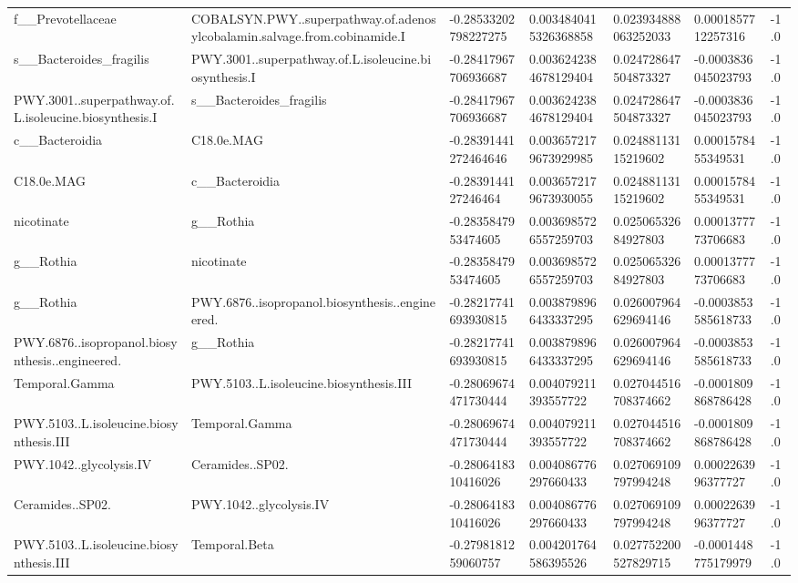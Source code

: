 \begin{longtable}{lllllll}
f\_\_Prevotellaceae & COBALSYN.PWY..superpathway.of.adenosylcobalamin.salvage.from.cobinamide.I & -0.28533202798227275 & 0.0034840415326368858 & 0.023934888063252033 & 0.0001857712257316 & -1.0 \\
s\_\_Bacteroides\_fragilis & PWY.3001..superpathway.of.L.isoleucine.biosynthesis.I & -0.28417967706936687 & 0.0036242384678129404 & 0.024728647504873327 & -0.0003836045023793 & -1.0 \\
PWY.3001..superpathway.of.L.isoleucine.biosynthesis.I & s\_\_Bacteroides\_fragilis & -0.28417967706936687 & 0.0036242384678129404 & 0.024728647504873327 & -0.0003836045023793 & -1.0 \\
c\_\_Bacteroidia & C18.0e.MAG & -0.28391441272464646 & 0.0036572179673929985 & 0.02488113115219602 & 0.0001578455349531 & -1.0 \\
C18.0e.MAG & c\_\_Bacteroidia & -0.2839144127246464 & 0.0036572179673930055 & 0.02488113115219602 & 0.0001578455349531 & -1.0 \\
nicotinate & g\_\_Rothia & -0.2835847953474605 & 0.0036985726557259703 & 0.02506532684927803 & 0.0001377773706683 & -1.0 \\
g\_\_Rothia & nicotinate & -0.2835847953474605 & 0.0036985726557259703 & 0.02506532684927803 & 0.0001377773706683 & -1.0 \\
g\_\_Rothia & PWY.6876..isopropanol.biosynthesis..engineered. & -0.28217741693930815 & 0.0038798966433337295 & 0.026007964629694146 & -0.0003853585618733 & -1.0 \\
PWY.6876..isopropanol.biosynthesis..engineered. & g\_\_Rothia & -0.28217741693930815 & 0.0038798966433337295 & 0.026007964629694146 & -0.0003853585618733 & -1.0 \\
Temporal.Gamma & PWY.5103..L.isoleucine.biosynthesis.III & -0.28069674471730444 & 0.004079211393557722 & 0.027044516708374662 & -0.0001809868786428 & -1.0 \\
PWY.5103..L.isoleucine.biosynthesis.III & Temporal.Gamma & -0.28069674471730444 & 0.004079211393557722 & 0.027044516708374662 & -0.0001809868786428 & -1.0 \\
PWY.1042..glycolysis.IV & Ceramides..SP02. & -0.2806418310416026 & 0.004086776297660433 & 0.027069109797994248 & 0.0002263996377727 & -1.0 \\
Ceramides..SP02. & PWY.1042..glycolysis.IV & -0.2806418310416026 & 0.004086776297660433 & 0.027069109797994248 & 0.0002263996377727 & -1.0 \\
PWY.5103..L.isoleucine.biosynthesis.III & Temporal.Beta & -0.2798181259060757 & 0.004201764586395526 & 0.027752200527829715 & -0.0001448775179979 & -1.0 \\

\end{longtable}
